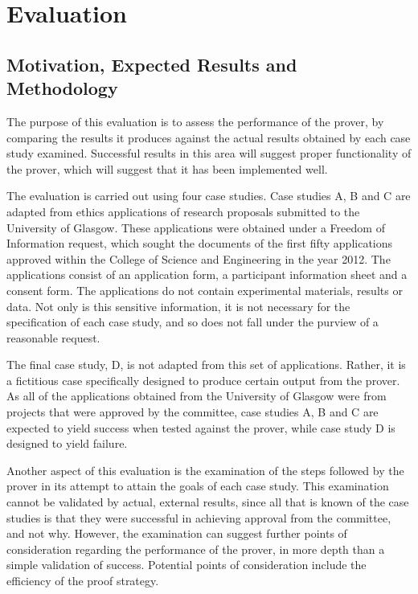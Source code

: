 \documentclass{l4proj}
\begin{document}
\chapter{Evaluation}

\section{Motivation, Expected Results and Methodology}
The purpose of this evaluation is to assess the performance of the prover, by comparing the results it produces against the actual results obtained by each case study examined. Successful results in this area will suggest proper functionality of the prover, which will suggest that it has been implemented well. 

The evaluation is carried out using four case studies. Case studies A, B and C are adapted from ethics applications of research proposals submitted to the University of Glasgow. These applications were obtained under a Freedom of Information request, which sought the documents of the first fifty applications approved within the College of Science and Engineering in the year 2012. The applications consist of an application form, a participant information sheet and a consent form. The applications do not contain experimental materials, results or data. Not only is this sensitive information, it is not necessary for the specification of each case study, and so does not fall under the purview of a reasonable request. 

The final case study, D, is not adapted from this set of applications. Rather, it is a fictitious case specifically designed to produce certain output from the prover. As all of the applications obtained from the University of Glasgow were from projects that were approved by the committee, case studies A, B and C are expected to yield success when tested against the prover, while case study D is designed to yield failure. 

Another aspect of this evaluation is the examination of the steps followed by the prover in its attempt to attain the goals of each case study. This examination cannot be validated by actual, external results, since all that is known of the case studies is that they were successful in achieving approval from the committee, and not why. However, the examination can suggest further points of consideration regarding the performance of the prover, in more depth than a simple validation of success. Potential points of consideration include the efficiency of the proof strategy. 
\end{document}
